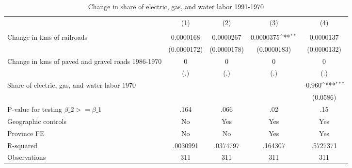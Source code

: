 \begin{table}[htbp]\centering
\def\sym#1{\ifmmode^{#1}\else\(^{#1}\)\fi}
\caption{Change in share of electric, gas, and water labor 1991-1970}
\begin{tabular}{l*{4}{c}}
\hline\hline
                &\multicolumn{1}{c}{(1)}&\multicolumn{1}{c}{(2)}&\multicolumn{1}{c}{(3)}&\multicolumn{1}{c}{(4)}\\
                &\multicolumn{1}{c}{}&\multicolumn{1}{c}{}&\multicolumn{1}{c}{}&\multicolumn{1}{c}{}\\
\hline
Change in kms of railroads&0.0000168         &0.0000267         &0.0000375\sym{**} &0.0000137         \\
                &(0.0000172)         &(0.0000178)         &(0.0000183)         &(0.0000132)         \\
[1em]
Change in kms of paved and gravel roads 1986-1970&        0         &        0         &        0         &        0         \\
                &      (.)         &      (.)         &      (.)         &      (.)         \\
[1em]
Share of electric, gas, and water labor 1970&                  &                  &                  &   -0.960\sym{***}\\
                &                  &                  &                  & (0.0586)         \\
\hline
P-value for testing $\beta\_{2} >= \beta\_{1}$&     .164         &     .066         &      .02         &      .15         \\
Geographic controls&       No         &      Yes         &      Yes         &      Yes         \\
Province FE     &       No         &       No         &      Yes         &      Yes         \\
R-squared       & .0030991         & .0374797         &  .164307         & .5727371         \\
Observations    &      311         &      311         &      311         &      311         \\
\hline\hline
\end{tabular}
\end{table}
